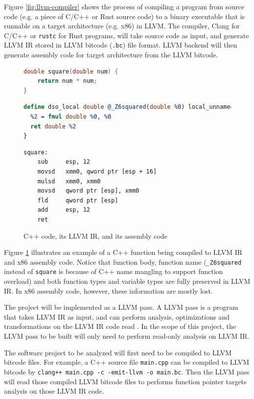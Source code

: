 \documentclass[12pt]{article}
\begin{document}
Figure \ref{fig:llvm-compiler} shows the process of compiling a program from source code (e.g. a piece of C/C++ or Rust source code) to a binary executable that is runnable on a target architecture (e.g. x86) in LLVM. The compiler, Clang for C/C++ or \texttt{rustc} for Rust programs, will take source code as input, and generate LLVM IR stored in LLVM bitcode (\texttt{.bc}) file format. LLVM backend will then generate assembly code for target architecture from the LLVM bitcode.

\begin{figure}[H]
    \centering
    \begin{lstlisting}[language=c]
double square(double num) {
    return num * num;
}
    \end{lstlisting}
    \begin{lstlisting}[language=llvm]
define dso_local double @_Z6squared(double %0) local_unnamed_addr #0 {
  %2 = fmul double %0, %0
  ret double %2
}
    \end{lstlisting}
    \begin{lstlisting}[language={[x86masm]Assembler}]
square:
    sub     esp, 12
    movsd   xmm0, qword ptr [esp + 16]
    mulsd   xmm0, xmm0
    movsd   qword ptr [esp], xmm0
    fld     qword ptr [esp]
    add     esp, 12
    ret
    \end{lstlisting}
    \caption{C++ code, its LLVM IR, and its assembly code}
    \label{fig:llvm-ir}
\end{figure}

Figure \ref{fig:llvm-ir} illustrates an example of a C++ function being compiled to LLVM IR and x86 assembly code. Notice that function body, function name (\texttt{\_Z6squared} instead of \texttt{square} is because of C++ name mangling to support function overload) and both function types and variable types are fully preserved in LLVM IR. In x86 assembly code, however, these information are mostly lost.

The project will be implemented as a LLVM pass. A LLVM pass is a program that takes LLVM IR as input, and can perform analysis, optimizations and transformations on the LLVM IR code read \cite{llvm-pass}. In the scope of this project, the LLVM pass to be built will only need to perform read-only analysis on LLVM IR.

The software project to be analyzed will first need to be compiled to LLVM bitcode files. For example, a C++ source file \texttt{main.cpp} can be compiled to LLVM bitcode by \texttt{clang++ main.cpp -c -emit-llvm -o main.bc}. Then the LLVM pass will read those compiled LLVM bitcode files to performs function pointer targets analysis on those LLVM IR code.
\end{document}
